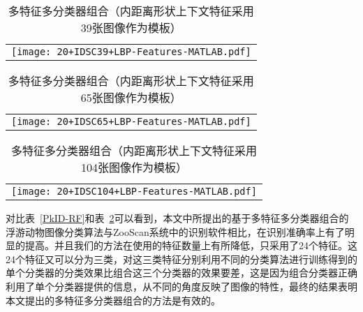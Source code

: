 \begin{table}
\centering
\caption{多特征多分类器组合（内距离形状上下文特征采用39张图像作为模板）}
\begin{tabular}{c}
\texttt{[image: 20+IDSC39+LBP-Features-MATLAB.pdf]}
\end{tabular}
\label{20+IDSC39+LBP-Features-MATLAB}
\end{table}

\begin{table}
\centering
\caption{多特征多分类器组合（内距离形状上下文特征采用65张图像作为模板）}
\begin{tabular}{c}
\texttt{[image: 20+IDSC65+LBP-Features-MATLAB.pdf]}
\end{tabular}
\label{20+IDSC65+LBP-Features-MATLAB}
\end{table}

\begin{table}
\centering
\caption{多特征多分类器组合（内距离形状上下文特征采用104张图像作为模板）}
\begin{tabular}{c}
\texttt{[image: 20+IDSC104+LBP-Features-MATLAB.pdf]}
\end{tabular}
\label{20+IDSC104+LBP-Features-MATLAB}
\end{table}

对比表~\ref{PkID-RF}和表~\ref{20+IDSC65+LBP-Features-MATLAB}可以看到，本文中所提出的基于多特征多分类器组合的浮游动物图像分类算法与ZooScan系统中的识别软件相比，在识别准确率上有了明显的提高。并且我们的方法在使用的特征数量上有所降低，只采用了24个特征。这24个特征又可以分为三类，对这三类特征分别利用不同的分类算法进行训练得到的单个分类器的分类效果比组合这三个分类器的效果要差，这是因为组合分类器正确利用了单个分类器提供的信息，从不同的角度反映了图像的特性，最终的结果表明本文提出的多特征多分类器组合的方法是有效的。
